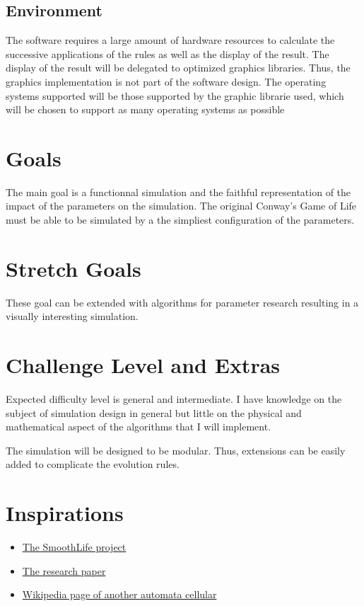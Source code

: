 \documentclass{article}
\begin{document}
\subsection{Environment}

The software requires a large amount of hardware resources to calculate the successive applications of the rules as well as the display of the result.
The display of the result will be delegated to optimized graphics libraries. Thus, the graphics implementation is not part of the software design. 
The operating systems supported will be those supported by the graphic librarie used, which will be chosen to support as many operating systems as possible

\section{Goals}

The main goal is a functionnal simulation and the faithful representation of the impact of the parameters on the simulation.
The original Conway's Game of Life must be able to be simulated by a the simpliest configuration of the parameters.

\section{Stretch Goals}

These goal can be extended with algorithms for parameter research resulting in a visually interesting simulation.

\section{Challenge Level and Extras}

Expected difficulty level is general and intermediate. I have knowledge on the subject of simulation design in general but little on the physical and mathematical aspect of the algorithms that I will implement. 

The simulation will be designed to be modular. Thus, extensions can be easily added to complicate the evolution rules.
  

\section{Inspirations}

\begin{itemize}
    \item \href{https://sourceforge.net/projects/smoothlife/}{The SmoothLife project}  
    \item \href{http://arxiv.org/abs/1111.1567}{The research paper}    
    \item \href{https://fr.wikipedia.org/wiki/Lenia}{Wikipedia page of another automata cellular} 
\end{itemize}
\end{document}
